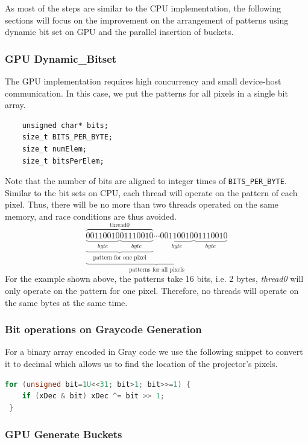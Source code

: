\documentclass[final,12pt,3p]{elsarticle}
\begin{document}
As most of the steps are similar to the CPU implementation, the following sections will focus on the improvement on the arrangement of patterns using dynamic bit set on GPU and the parallel insertion of buckets. 

\subsubsection{GPU Dynamic\_Bitset}\label{gpu-dynamicux5fbitset}

The GPU implementation requires high concurrency and small device-host
communication. In this case, we put the patterns for all pixels in a
single bit array.

\begin{verbatim}
    unsigned char* bits;
    size_t BITS_PER_BYTE;
    size_t numElem;
    size_t bitsPerElem;
\end{verbatim}

Note that the number of bits are aligned to integer times of
\texttt{BITS\_PER\_BYTE}. Similar to the bit sets on CPU, each thread
will operate on the pattern of each pixel. Thus, there will be no more than two threads operated on the same memory, and race conditions are thus avoided. \[
\underbrace{\overbrace{\underbrace{\underbrace{00110010}_{byte}\underbrace{01110010}_{byte}}}^{\text{thread0}}_{\text{pattern for one pixel}}\cdots\underbrace{00110010}_{byte}\underbrace{01110010}_{byte}}_{\text{patterns for all pixels}}
\] 
For the example shown above, the patterns take 16 bits, i.e. 2 bytes, \emph{thread0} will only operate on the pattern for one pixel. Therefore, no threads will operate on the same bytes at the same time.

\subsubsection{Bit operations on Graycode
Generation}\label{bit-operations-on-graycode-generation}

For a binary array encoded in Gray code we use the following snippet to convert it to decimal which allows us to find the location of the projector's pixels.

\begin{lstlisting}[language=C]
 for (unsigned bit=1U<<31; bit>1; bit>>=1) {
    if (xDec & bit) xDec ^= bit >> 1;
 }
\end{lstlisting}

\subsubsection{GPU Generate Buckets}\label{gpu-generate-buckets}
\end{document}
